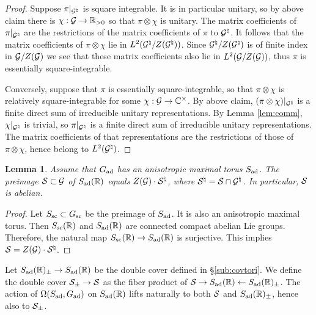 \documentclass{article}
\newtheorem{lem}[thm]{Lemma}
\theoremstyle{definition}
\numberwithin{equation}{section}
\renewcommand{\-}{\hyp{}}
\begin{document}
\begin{proof}
Suppose $\pi|_{\mathcal{G}^\natural}$ is square integrable. It is in particular unitary, so by above claim there is $\chi : \mathcal{G} \to \mathbb{R}_{>0}$ so that $\pi\otimes\chi$ is unitary. The matrix coefficients of $\pi|_{\mathcal{G}^\natural}$ are the restrictions of the matrix coefficients of $\pi$ to $\mathcal{G}^\natural$. It follows that the matrix coefficients of $\pi\otimes\chi$ lie in $L^2(\mathcal{G}^\natural/Z(\mathcal{G}^\natural))$. Since $\mathcal{G}^\natural/Z(\mathcal{G}^\natural)$ is of finite index in $\mathcal{G}/Z(\mathcal{G})$ we see that these matrix coefficients also lie in $L^2(\mathcal{G}/Z(\mathcal{G}))$, thus $\pi$ is essentially square-integrable.

Conversely, suppose that $\pi$ is essentially square-integrable, so that $\pi\otimes\chi$ is relatively square-integrable for some $\chi : \mathcal{G} \to \mathbb{C}^\times$. By above claim, $(\pi\otimes\chi)|_{\mathcal{G}^\natural}$ is a finite direct sum of irreducible unitary representations. By Lemma \ref{lem:comm}, $\chi|_{\mathcal{G}^\natural}$ is trivial, so $\pi|_{\mathcal{G}^\natural}$ is a finite direct sum of irreducible unitary representations. The matrix coefficients of that representations are the restrictions of those of $\pi\otimes\chi$, hence belong to $L^2(\mathcal{G}^\natural)$.
\end{proof}

\begin{lem} \label{lem:ani}
Assume that $G_{\textrm{ad}}$ has an anisotropic maximal torus $S_{\textrm{ad}}$. The preimage $\mathcal{S} \subset \mathcal{G}$ of $S_{\textrm{ad}}(\mathbb{R})$ equals $Z(\mathcal{G}) \cdot \mathcal{S}^\natural$, where $\mathcal{S}^\natural = \mathcal{S} \cap \mathcal{G}^\natural$. In particular, $\mathcal{S}$ is abelian.
\end{lem}
\begin{proof}
	Let $S_{\textrm{sc}} \subset G_{\textrm{sc}}$ be the preimage of $S_{\textrm{ad}}$. It is also an anisotropic maximal torus. Then $S_{\textrm{sc}}(\mathbb{R})$ and $S_{\textrm{ad}}(\mathbb{R})$ are connected compact abelian Lie groups. Therefore, the natural map $S_{\textrm{sc}}(\mathbb{R}) \to S_{\textrm{ad}}(\mathbb{R})$ is surjective. This implies $\mathcal{S} = Z(\mathcal{G}) \cdot \mathcal{S}^\natural$.
\end{proof}

Let $S_{\textrm{ad}}(\mathbb{R})_\pm \to S_{\textrm{ad}}(\mathbb{R})$ be the double cover defined in \S\ref{sub:covtori}. We define the double cover $\mathcal{S}_\pm \to \mathcal{S}$ as the fiber product of $\mathcal{S} \to S_{\textrm{ad}}(\mathbb{R}) \leftarrow S_{\textrm{ad}}(\mathbb{R})_\pm$. The action of $\Omega(S_{\textrm{ad}},G_{\textrm{ad}})$ on $S_{\textrm{ad}}(\mathbb{R})$ lifts naturally to both $\mathcal{S}$ and $S_{\textrm{ad}}(\mathbb{R})_\pm$, hence also to $\mathcal{S}_\pm$.
\end{document}
